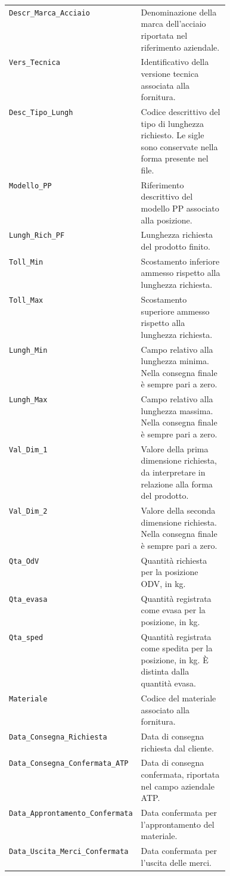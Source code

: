 \begin{longtable}{@{}p{0.43\linewidth}p{}@{}}
\texttt{Descr\_Marca\_Acciaio} & Denominazione della marca dell'acciaio riportata nel riferimento aziendale. \\
\texttt{Vers\_Tecnica} & Identificativo della versione tecnica associata alla fornitura. \\
\texttt{Desc\_Tipo\_Lungh} & Codice descrittivo del tipo di lunghezza richiesto. Le sigle sono conservate nella forma presente nel file. \\
\texttt{Modello\_PP} & Riferimento descrittivo del modello PP associato alla posizione. \\
\texttt{Lungh\_Rich\_PF} & Lunghezza richiesta del prodotto finito. \\
\texttt{Toll\_Min} & Scostamento inferiore ammesso rispetto alla lunghezza richiesta. \\
\texttt{Toll\_Max} & Scostamento superiore ammesso rispetto alla lunghezza richiesta. \\
\texttt{Lungh\_Min} & Campo relativo alla lunghezza minima. Nella consegna finale è sempre pari a zero. \\
\texttt{Lungh\_Max} & Campo relativo alla lunghezza massima. Nella consegna finale è sempre pari a zero. \\
\texttt{Val\_Dim\_1} & Valore della prima dimensione richiesta, da interpretare in relazione alla forma del prodotto. \\
\texttt{Val\_Dim\_2} & Valore della seconda dimensione richiesta. Nella consegna finale è sempre pari a zero. \\
\texttt{Qta\_OdV} & Quantità richiesta per la posizione ODV, in kg. \\
\texttt{Qta\_evasa} & Quantità registrata come evasa per la posizione, in kg. \\
\texttt{Qta\_sped} & Quantità registrata come spedita per la posizione, in kg. È distinta dalla quantità evasa. \\
\texttt{Materiale} & Codice del materiale associato alla fornitura. \\
\texttt{Data\_Consegna\_Richiesta} & Data di consegna richiesta dal cliente. \\
\texttt{Data\_Consegna\_Confermata\_ATP} & Data di consegna confermata, riportata nel campo aziendale ATP. \\
\texttt{Data\_Approntamento\_Confermata} & Data confermata per l'approntamento del materiale. \\
\texttt{Data\_Uscita\_Merci\_Confermata} & Data confermata per l'uscita delle merci. \\

\end{longtable}
